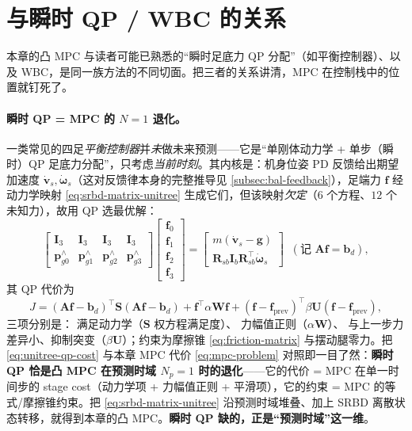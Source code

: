 \section{与瞬时 QP / WBC 的关系}
\label{sec:relation}

本章的凸 MPC 与读者可能已熟悉的“瞬时足底力 QP 分配”（如平衡控制器）、以及 WBC，是同一族方法的不同切面。把三者的关系讲清，MPC 在控制栈中的位置就钉死了。

\paragraph{瞬时 QP = MPC 的 $N=1$ 退化。}
一类常见的四足\emph{平衡控制器}并\emph{未}做未来预测——它是“单刚体动力学 + 单步（瞬时）QP 足底力分配”，只考虑\emph{当前时刻}\cite{unitree2023quadruped}。其内核是：机身位姿 PD 反馈给出期望加速度 $\dot{\boldsymbol{v}}_s,\dot{\boldsymbol{\omega}}_s$（这对反馈律本身的完整推导见 \cref{subsec:bal-feedback}），足端力 $\mathbf{f}$ 经动力学映射 \cref{eq:srbd-matrix-unitree} 生成它们，但该映射\emph{欠定}（$6$ 个方程、$12$ 个未知力），故用 QP 选最优解：
\begin{equation}
  \begin{bmatrix}\mathbf{I}_3&\mathbf{I}_3&\mathbf{I}_3&\mathbf{I}_3\\ \boldsymbol{p}_{g0}^{\wedge}&\boldsymbol{p}_{g1}^{\wedge}&\boldsymbol{p}_{g2}^{\wedge}&\boldsymbol{p}_{g3}^{\wedge}\end{bmatrix}
  \begin{bmatrix}\mathbf{f}_{0}\\\mathbf{f}_{1}\\\mathbf{f}_{2}\\\mathbf{f}_{3}\end{bmatrix}
  =\begin{bmatrix}m(\dot{\boldsymbol{v}}_s-\boldsymbol{g})\\ \mathbf{R}_{sb}\mathbf{I}_b\mathbf{R}_{sb}^\top\dot{\boldsymbol{\omega}}_s\end{bmatrix}
  \;\;(\text{记 }\mathbf{A}\mathbf{f}=\mathbf{b}_d),
  \label{eq:srbd-matrix-unitree}
\end{equation}
其 QP 代价为\cite{unitree2023quadruped}
\begin{equation}
  J=(\mathbf{A}\mathbf{f}-\mathbf{b}_d)^\top\mathbf{S}(\mathbf{A}\mathbf{f}-\mathbf{b}_d)+\mathbf{f}^\top\alpha\mathbf{W}\mathbf{f}+(\mathbf{f}-\mathbf{f}_{\text{prev}})^\top\beta\mathbf{U}(\mathbf{f}-\mathbf{f}_{\text{prev}}),
  \label{eq:unitree-qp-cost}
\end{equation}
三项分别是： 满足动力学（$\mathbf{S}$ 权方程满足度）、 力幅值正则（$\alpha\mathbf{W}$）、 与上一步力差异小、抑制突变（$\beta\mathbf{U}$）；约束为摩擦锥 \cref{eq:friction-matrix} 与摆动腿零力。把 \cref{eq:unitree-qp-cost} 与本章 MPC 代价 \cref{eq:mpc-problem} 对照即一目了然：\textbf{瞬时 QP 恰是凸 MPC 在预测时域 $N_p=1$ 时的退化}——它的代价 = MPC 在单一时间步的 stage cost（动力学项 + 力幅值正则 + 平滑项），它的约束 = MPC 的等式/摩擦锥约束。把 \cref{eq:srbd-matrix-unitree} 沿预测时域堆叠、加上 SRBD 离散状态转移，就得到本章的凸 MPC。\textbf{瞬时 QP 缺的，正是“预测时域”这一维}\cite{unitree2023quadruped}。

